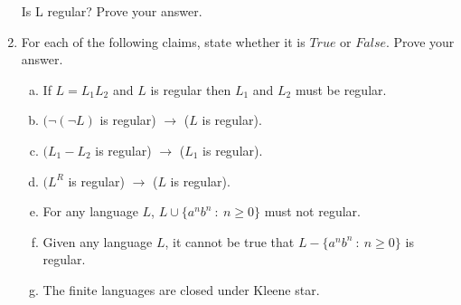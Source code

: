 \documentclass[10pt]{article}
\begin{document}
\begin{enumerate}[1)]
Is L regular?  Prove your answer.


\item
For each of the following claims, state whether it is $True$ or $False$.  Prove your answer.
\begin{enumerate}[a)]
\item
If $L = L_1L_2$ and $L$ is regular then $L_1$ and $L_2$ must be regular.

\item
$(\lnot (\lnot L)$ is regular) $\rightarrow$ ($L$ is regular).

\item
$(L_1 - L_2$ is regular) $\rightarrow$ ($L_1$ is regular).

\item
$(L^R$ is regular) $\rightarrow$ ($L$ is regular).

\item
For any language $L$, $L \cup \{a^nb^n\ :\ n \geq 0\}$ must not regular.

\item
Given any language $L$, it cannot be true that $L - \{a^nb^n\ :\ n \geq 0\}$ is regular.

\item
The finite languages are closed under Kleene star.

\end{enumerate}
\end{enumerate}
\end{document}
